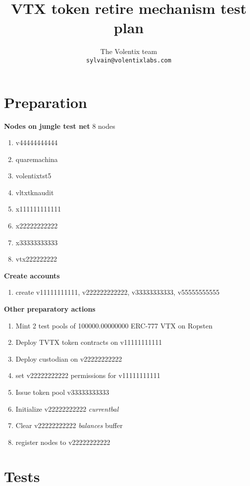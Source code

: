 \documentclass[]{article}
\title{VTX token retire mechanism test plan}
\author{
		The Volentix team\\
	\texttt{sylvain@volentixlabs.com}
}
\begin{document}
\maketitle


\section{Preparation}

\textbf{	Nodes on jungle test net}
	8 nodes
	\begin{enumerate}
		\paragraph{}
		\item v44444444444 
		\item quaremachina
		\item volentixtst5
		\item vltxtknaudit
		\item x111111111111
		\item x22222222222
		\item  x33333333333
		\item  vtx222222222				
	  \end{enumerate}
\textbf{Create accounts}
\begin{enumerate}
\item create v11111111111, v222222222222, v33333333333, v55555555555
\end{enumerate} 
 \textbf{Other preparatory actions}
  		\begin{enumerate}
		  \item Mint 2 test pools of  100000.00000000 ERC-777 VTX on Ropsten
		  \item Deploy TVTX token contracts on v11111111111 
		  \item Deploy custodian on v22222222222
		  \item set v22222222222 permissions for v11111111111
		  \item Issue token pool v33333333333
		  \item Initialize v22222222222 \textit{currentbal}
		  \item Clear v22222222222 \textit{balances} buffer
		    \item register nodes to v22222222222\\
	 \end{enumerate}
  

\section{Tests}
\end{document}
